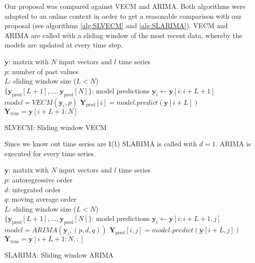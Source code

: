 Our proposal was compared against VECM and ARIMA. Both algorithms were adapted
to an online context in order to get a reasonable comparison with our proposal
(see algorithms \ref{alg:SLVECM} and \ref{alg:SLARIMA}). VECM and ARIMA are
called with a sliding window of the most recent data, whereby the models are
updated at every time step.

\begin{algorithm}[ht]
\begin{algorithmic}[1]
\REQUIRE $\,$ \\
$\mathbf{y}$: matrix with $N$ input vectors and $l$ time series\\
$p$: number of past values \\
$L$: sliding window size ($L<N$) \\
\ENSURE  $\,$ \\
$\{ \mathbf{y}_{\text{pred}}[L+1],\dots,\mathbf{y}_{\text{pred}}[N]\}$: model predictions 
    \STATE $\mathbf{y}_i \gets \mathbf{y}[i:i+L+1]$
        \STATE $model = VECM(\mathbf{y}_i, p)$
        \STATE $\mathbf{Y}_{\text{pred}}[i] = model.predict(\mathbf{y}[i+L])$
\ENDFOR
\STATE $\mathbf{Y}_{\text{true}} = \mathbf{y}[i+L+1:N] $
\end{algorithmic}
\caption{SLVECM: Sliding window VECM}
\label{alg:SLVECM}
\end{algorithm}

Since we know out time series are I(1) SLARIMA is called with $d=1$. ARIMA is
executed for every time series. 

\begin{algorithm}[ht]
\begin{algorithmic}[1]
\REQUIRE $\,$ \\
$\mathbf{y}$: matrix with $N$ input vectors and $l$ time series\\
$p$: autoregressive order \\
$d$: integrated order\\
$q$: moving average order\\
$L$: sliding window size ($L<N$) \\
\ENSURE  $\,$ \\
$\{ \mathbf{y}_{\text{pred}}[L+1],\dots,\mathbf{y}_{\text{pred}}[N]\}$: model predictions 
    \STATE $\mathbf{y}_i \gets \mathbf{y}[i:i+L+1,j]$
        \STATE $model = ARIMA(\mathbf{y}_i, (p,d,q))$
        \STATE $\mathbf{Y}_{\text{pred}}[i,j] = model.predict(\mathbf{y}[i+L,j])$
\ENDFOR
\ENDFOR
\STATE $\mathbf{Y}_{\text{true}} = \mathbf{y}[i+L+1:N,:] $
\end{algorithmic}
\caption{SLARIMA: Sliding window ARIMA}
\label{alg:SLARIMA}
\end{algorithm}

